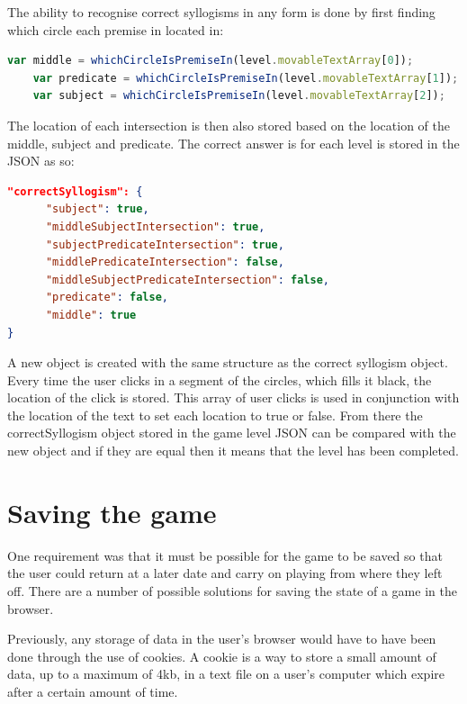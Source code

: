 \documentclass[12pt,a4paper]{report}
\begin{document}
The ability to recognise correct syllogisms in any form is done by first finding which circle each premise in located in:

\begin{minipage}{\linewidth}
\begin{lstlisting}[language=JavaScript]
    var middle = whichCircleIsPremiseIn(level.movableTextArray[0]);
    var predicate = whichCircleIsPremiseIn(level.movableTextArray[1]);
    var subject = whichCircleIsPremiseIn(level.movableTextArray[2]);
\end{lstlisting}
\end{minipage}

The location of each intersection is then also stored based on the location of the middle, subject and predicate.
The correct answer is for each level is stored in the JSON as so:

\begin{minipage}{\linewidth}
\begin{lstlisting}[language=json]
"correctSyllogism": {
      "subject": true,
      "middleSubjectIntersection": true,
      "subjectPredicateIntersection": true,
      "middlePredicateIntersection": false,
      "middleSubjectPredicateIntersection": false,
      "predicate": false,
      "middle": true
}
\end{lstlisting}
\end{minipage}

A new object is created with the same structure as the correct syllogism object.
Every time the user clicks in a segment of the circles, which fills it black, the location of the click is stored. This array of user clicks is used in conjunction with the location of the text to set each location to true or false. From there the correctSyllogism object stored in the game level JSON can be compared with the new object and if they are equal then it means that the level has been completed.

\section{Saving the game}
One requirement was that it must be possible for the game to be saved so that the user could return at a later date and carry on playing from where they left off. There are a number of possible solutions for saving the state of a game in the browser.

Previously, any storage of data in the user's browser would have to have been done through the use of cookies. A cookie is a way to store a small amount of data, up to a maximum of 4kb, in a text file on a user's computer which expire after a certain amount of time.
\end{document}
